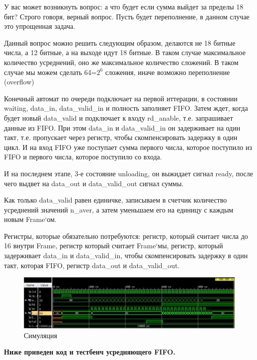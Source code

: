У вас может возникнуть вопрос: а что будет если сумма выйдет за пределы 18 бит? Строго говоря, верный вопрос. Пусть будет переполнение, в данном случае это упрощенная задача.

Данный вопрос можно решить следующим образом, делаются не 18 битные числа, а 12 битные, а на выходе идут 18 битные. В таком случае максимальное количество усреднений, оно же максимальное количество сложений. В таком случае мы можем сделать 64=$2^6$ сложения, иначе возможно переполнение (overflow)

Конечный автомат по очереди подключает на первой иттерации, в состоянии waiting, data\_in, data\_valid\_in и полность заполняет FIFO. Затем ждет, когда будет новый data\_valid и подключает к входу rd\_anable, т.е. запрашивает данные из FIFO. При этом data\_in и data\_valid\_in он задерживает на один такт, т.е. пропускает через регистр, чтобы скомпенсировать задержку в один цикл. И на вход FIFO уже поступает сумма первого числа, которое поступило из FIFO и первого числа, которое поступило со входа.

И на последнем этапе, 3-е состояние unloading, он выжидает сигнал ready, после чего выдвет на data\_out и data\_valid\_out сигнал суммы. 

Как только data\_valid равен единичке, записываем в счетчик количество усреднений значений n\_aver, а затем уменьшаем его на единицу с каждым новым Frame`ом.

Регистры, которые обязательно потребуются: регистр, который считает числа до 16 внутри Frame, регистр который считает Frame`мы, регистр, который задерживает data\_in и data\_valid\_in, чтобы скомпенсировать задержку в один такт, которая FIFO, регистр data\_out и data\_valid\_out.

\begin{figure}[h]
\centering
\includegraphics[width=1.1\textwidth]{simulation}
\caption{Симуляция}
\label{simulation}
\end{figure}

\begin{center}
\textbf{Ниже приведен код и тестбенч усредняющего FIFO.}
\end{center}

